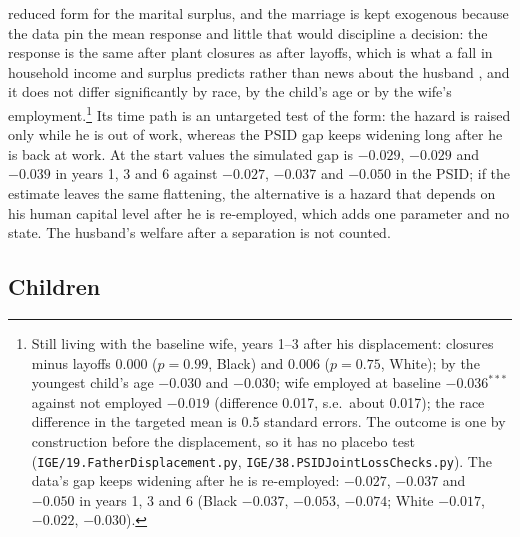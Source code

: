 reduced form for the marital surplus, and the marriage is kept exogenous because the data pin the mean response and
little that would discipline a decision: the response is the same after plant closures as after layoffs, which is
what a fall in household income and surplus predicts rather than news about the husband \citep{charles2004job}, and
it does not differ significantly by race, by the child's age or by the wife's employment.\footnote{Still living with
the baseline wife, years 1--3 after his displacement: closures minus layoffs 0.000 ($p = 0.99$, Black) and 0.006
($p = 0.75$, White); by the youngest child's age $-0.030$ and $-0.030$; wife employed at baseline $-0.036^{***}$
against not employed $-0.019$ (difference 0.017, s.e.\ about 0.017); the race difference in the targeted mean is 0.5
standard errors. The outcome is one by construction before the displacement, so it has no placebo test
(\texttt{IGE/19.FatherDisplacement.py}, \texttt{IGE/38.PSIDJointLossChecks.py}). The data's gap keeps widening after
he is re-employed: $-0.027$, $-0.037$ and $-0.050$ in years 1, 3 and 6 (Black $-0.037$, $-0.053$, $-0.074$; White
$-0.017$, $-0.022$, $-0.030$).} Its time path is an untargeted test of the form: the hazard is raised only while he is
out of work, whereas the PSID gap keeps widening long after he is back at work. At the start values the simulated
gap is $-0.029$, $-0.029$ and $-0.039$ in years 1, 3 and 6 against $-0.027$, $-0.037$ and $-0.050$ in the PSID; if the
estimate leaves the same flattening, the alternative is a hazard that depends on his human capital level after he is
re-employed, which adds one parameter and no state. The husband's welfare after a
separation is not counted.

\subsection{Children}

